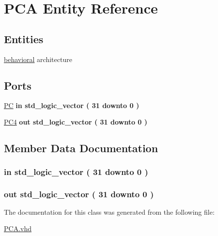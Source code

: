 \hypertarget{class_p_c_a}{\section{\-P\-C\-A \-Entity \-Reference}
\label{class_p_c_a}
}
\subsection*{\-Entities}
\begin{DoxyCompactItemize}
\item 
\hyperlink{class_p_c_a_1_1behavioral}{behavioral} architecture
\end{DoxyCompactItemize}
\*
\*
\subsection*{\-Ports}
 \begin{DoxyCompactItemize}
\item 
\hyperlink{class_p_c_a_acada270fc7a566335257788edda0be9e}{\-P\-C}  {\bfseries {\bfseries in }} {\bfseries std\-\_\-logic\-\_\-vector (   31    downto    0  ) } 
\item 
\hyperlink{class_p_c_a_aa9f65dcf2c43f75406aff2f2f4f6d577}{\-P\-C4}  {\bfseries {\bfseries out }} {\bfseries std\-\_\-logic\-\_\-vector (   31    downto    0  ) } 
\end{DoxyCompactItemize}


\subsection{\-Member \-Data \-Documentation}
\hypertarget{class_p_c_a_acada270fc7a566335257788edda0be9e}{
\subsubsection[{\-P\-C}]{ {\bfseries in } {\bfseries std\-\_\-logic\-\_\-vector (   31    downto    0  ) } }}\label{class_p_c_a_acada270fc7a566335257788edda0be9e}
\hypertarget{class_p_c_a_aa9f65dcf2c43f75406aff2f2f4f6d577}{
\subsubsection[{\-P\-C4}]{ {\bfseries out } {\bfseries std\-\_\-logic\-\_\-vector (   31    downto    0  ) } }}\label{class_p_c_a_aa9f65dcf2c43f75406aff2f2f4f6d577}


\-The documentation for this class was generated from the following file\-:\begin{DoxyCompactItemize}
\item 
\hyperlink{_p_c_a_8vhd}{\-P\-C\-A.\-vhd}\end{DoxyCompactItemize}
